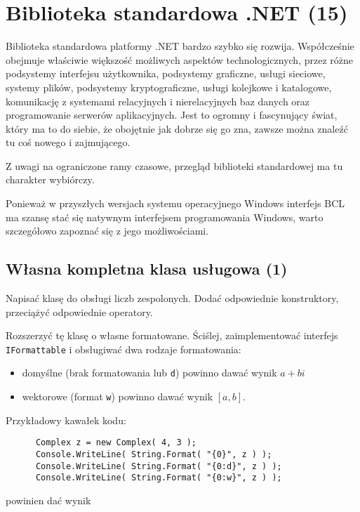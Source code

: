 ﻿\section{Biblioteka standardowa .NET (15)}

    Biblioteka standardowa platformy .NET bardzo szybko się rozwija. Współcześnie obejmuje właściwie większość możliwych aspektów technologicznych, przez różne
	podsystemy interfejsu użytkownika, podsystemy graficzne, usługi sieciowe, systemy plików, podsystemy kryptograficzne, usługi kolejkowe i katalogowe, komunikację z systemami
	relacyjnych i nierelacyjnych baz danych oraz programowanie serwerów aplikacyjnych. Jest to ogromny i fascynujący świat, który ma to do siebie, że obojętnie jak dobrze się go zna,
	zawsze można znaleźć tu coś nowego i zajmującego.

	Z uwagi na ograniczone ramy czasowe, przegląd biblioteki standardowej ma tu charakter wybiórczy. 
	
	Ponieważ w przyszłych wersjach systemu operacyjnego Windows interfejs BCL ma szansę
	  stać się natywnym interfejsem programowania Windows, warto szczegółowo zapoznać się z jego możliwościami.
      
\subsection{Własna kompletna klasa usługowa (1)}
      Napisać klasę do obsługi liczb zespolonych. Dodać odpowiednie konstruktory, przeciążyć odpowiednie operatory.
\label{liczby_zespolone}
      
      Rozszerzyć tę klasę o własne formatowane. Ściślej, zaimplementować interfejs
      {\tt IFormat\-table} i obsługiwać dwa rodzaje formatowania:
      \begin{itemize}
      \item domyślne (brak formatowania lub {\tt d}) powinno dawać wynik $a+bi$ 
      \item wektorowe (format {\tt w}) powinno dawać wynik $[a,b]$.
      \end{itemize}
      
      Przykładowy kawałek kodu:
      \begin{verbatim}
      Complex z = new Complex( 4, 3 );
      Console.WriteLine( String.Format( "{0}", z ) );
      Console.WriteLine( String.Format( "{0:d}", z ) );
      Console.WriteLine( String.Format( "{0:w}", z ) );
      \end{verbatim}

      powinien dać wynik

